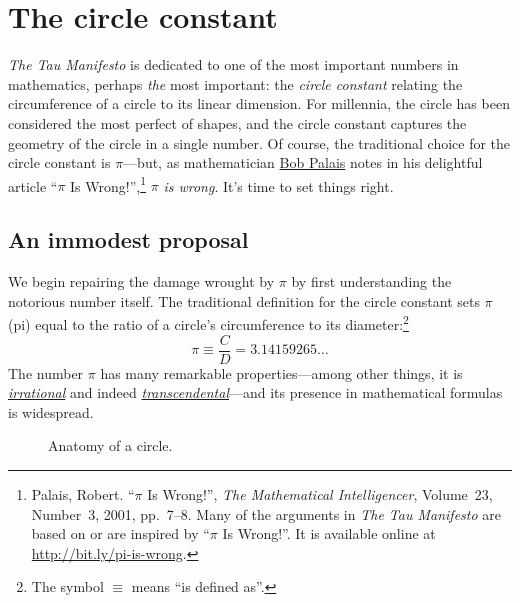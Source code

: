 

\section{The circle constant} %
\label{sec:the_circle_constant}

\emph{The Tau Manifesto} is dedicated to one of the most important numbers in mathematics, perhaps \emph{the} most important: the \emph{circle constant} relating the circumference of a circle to its linear dimension. For millennia, the circle has been considered the most perfect of shapes, and the circle constant captures the geometry of the circle in a single number. Of course, the traditional choice for the circle constant is $\pi$---but, as mathematician \href{http://www.math.utah.edu/~palais}{Bob Palais} notes in his delightful article ``$\pi$ Is Wrong!'',\footnote{Palais, Robert. ``$\pi$ Is Wrong!'', \emph{The Mathematical Intelligencer}, Volume~23, Number~3, 2001, pp.~7--8. Many of the arguments in \emph{The Tau Manifesto} are based on or are inspired by ``$\pi$ Is Wrong!''. It is available online at \href{http://www.math.utah.edu/~palais/pi.html}{http://bit.ly/pi-is-wrong}.} $\pi$ \emph{is wrong}. It's time to set things right.

  \subsection{An immodest proposal} %
  \label{sec:an_immodest_proposal}

We begin repairing the damage wrought by $\pi$ by first understanding the notorious number itself. The traditional definition for the circle constant sets $\pi$ (pi) equal to the ratio of a circle's circumference to its diameter:\footnote{The symbol $\equiv$ means ``is defined as''.}
\[
  \pi \equiv \frac{C}{D} = 3.14159265\ldots
\]
The number $\pi$ has many remarkable properties---among other things, it is \href{http://en.wikipedia.org/wiki/Irrational_number}{\emph{irrational}} and indeed \href{http://en.wikipedia.org/wiki/Transcendental_number}{\emph{transcendental}}---and its presence in mathematical formulas is widespread.

\begin{figure}
\caption{Anatomy of a circle.\label{fig:circle}}
\end{figure}

